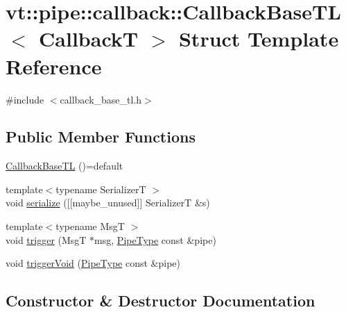 \hypertarget{structvt_1_1pipe_1_1callback_1_1_callback_base_t_l}{}\section{vt\+:\+:pipe\+:\+:callback\+:\+:Callback\+Base\+TL$<$ CallbackT $>$ Struct Template Reference}
\label{structvt_1_1pipe_1_1callback_1_1_callback_base_t_l}


{\ttfamily \#include $<$callback\+\_\+base\+\_\+tl.\+h$>$}

\subsection*{Public Member Functions}
\begin{DoxyCompactItemize}
\item 
\hyperlink{structvt_1_1pipe_1_1callback_1_1_callback_base_t_l_a9fd040600f47976c437cf0b9b0eda1f5}{Callback\+Base\+TL} ()=default
\item 
{\footnotesize template$<$typename SerializerT $>$ }\\void \hyperlink{structvt_1_1pipe_1_1callback_1_1_callback_base_t_l_a881775a6243c432e7536735d481a5d9a}{serialize} (\mbox{[}\mbox{[}maybe\+\_\+unused\mbox{]}\mbox{]} SerializerT \&s)
\item 
{\footnotesize template$<$typename MsgT $>$ }\\void \hyperlink{structvt_1_1pipe_1_1callback_1_1_callback_base_t_l_ac9deeadfe2d31c1f18051f1238f6c1d7}{trigger} (MsgT $\ast$msg, \hyperlink{namespacevt_ac9852acda74d1896f48f406cd72c7bd3}{Pipe\+Type} const \&pipe)
\item 
void \hyperlink{structvt_1_1pipe_1_1callback_1_1_callback_base_t_l_a5d1658201aadd7363abf13a367c135b0}{trigger\+Void} (\hyperlink{namespacevt_ac9852acda74d1896f48f406cd72c7bd3}{Pipe\+Type} const \&pipe)
\end{DoxyCompactItemize}


\subsection{Constructor \& Destructor Documentation}
\mbox{\label{structvt_1_1pipe_1_1callback_1_1_callback_base_t_l_a9fd040600f47976c437cf0b9b0eda1f5}} 
